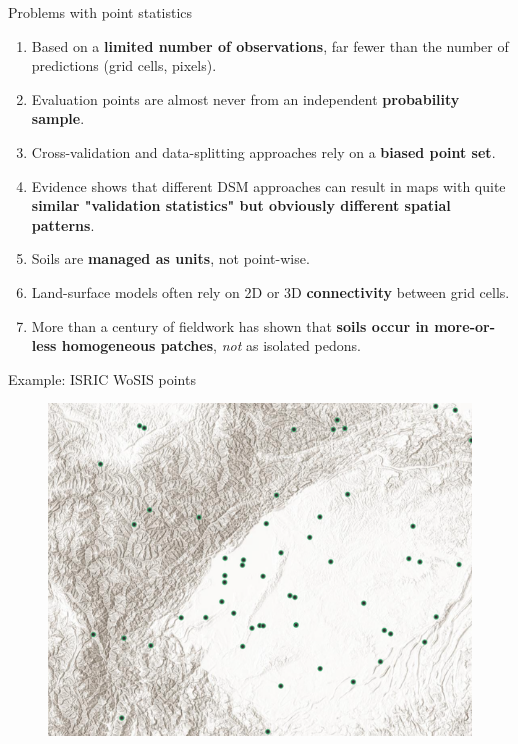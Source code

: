 \documentclass[aspectratio=169]{beamer}
\begin{document}
\begin{frame}{Problems with point statistics}
\begin{enumerate}
    \item Based on a \textbf{limited number of observations}, far fewer than the number of predictions (grid cells, pixels).
\item Evaluation points are almost never from an independent \textbf{probability sample}.
\item Cross-validation and data-splitting approaches rely on a \textbf{biased point set}.
\item Evidence shows that different DSM approaches can result in maps with quite \textbf{similar "validation statistics" but obviously different spatial patterns}.
\item  Soils are \textbf{managed as units}, not point-wise.
\item  Land-surface models often rely on 2D or 3D \textbf{connectivity} between grid cells.
\item  More than a century of fieldwork has shown that \textbf{soils occur in more-or-less homogeneous patches}, \emph{not} as isolated pedons.
  \end{enumerate}
  
\end{frame}

\begin{frame}{Example: ISRIC WoSIS points}
\begin{figure}
    \centering
\includegraphics[height=0.8\textheight]{./graphics_david/SoilGridsProfiles_Chengdu.png}
\end{figure}
\end{frame}
\end{document}
